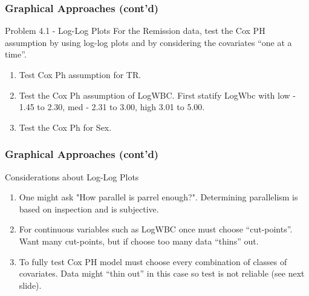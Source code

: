 \documentclass{beamer}
\theoremstyle{definition}
\begin{document}
\begin{frame}
\frametitle{Graphical Approaches (cont'd)}
\begin{block}{Problem 4.1 - Log-Log Plots}
For the Remission data, test the Cox PH assumption by using log-log plots and by considering the covariates ``one at a time''.
\begin{enumerate}
\item Test Cox Ph assumption for TR.
\item Test the Cox Ph assumption of LogWBC. First statify LogWbc with low - 1.45 to 2.30, med - 2.31 to 3.00, high 3.01 to 5.00.
\item Test the Cox Ph for Sex.
\end{enumerate}
\end{block}
\end{frame}

\begin{frame}
\frametitle{Graphical Approaches (cont'd)}
\begin{block}{Considerations about Log-Log Plots}
\begin{enumerate}
\item  One might ask "How parallel is parrel enough?". Determining parallelism is based on inspection and is subjective. 
\item  For continuous variables such as LogWBC once must choose ``cut-points''. Want many cut-points, but if choose too many data ``thins'' out.
\item  To fully test Cox PH model must choose every combination of classes of covariates. Data might ``thin out'' in this case so test is not reliable (see next slide).  
\end{enumerate}
\end{block}
\end{frame}
\end{document}
